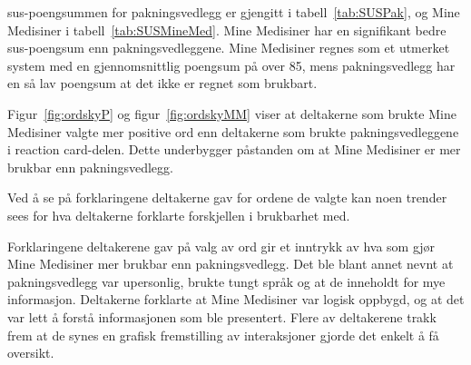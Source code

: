 \acrshort{sus}-poengsummen for pakningsvedlegg er gjengitt i tabell~\ref{tab:SUSPak}, og Mine Medisiner i tabell~\ref{tab:SUSMineMed}. Mine Medisiner har en signifikant bedre \acrshort{sus}-poengsum enn pakningsvedleggene. Mine Medisiner regnes som et utmerket system med en gjennomsnittlig poengsum på over 85, mens pakningsvedlegg har en så lav poengsum at det ikke er regnet som brukbart. 

Figur~\ref{fig:ordskyP} og figur~\ref{fig:ordskyMM} viser at deltakerne som brukte Mine Medisiner valgte mer positive ord enn deltakerne som brukte pakningsvedleggene i reaction card-delen. Dette underbygger påstanden om at Mine Medisiner er mer brukbar enn pakningsvedlegg. 

Ved å se på forklaringene deltakerne gav for ordene de valgte kan noen trender sees for hva deltakerne forklarte forskjellen i brukbarhet med.

Forklaringene deltakerene gav på valg av ord gir et inntrykk av hva som gjør Mine Medisiner mer brukbar enn pakningsvedlegg. Det ble blant annet nevnt at pakningsvedlegg var upersonlig, brukte tungt språk og at de inneholdt for mye informasjon. Deltakerne forklarte at Mine Medisiner var logisk oppbygd, og at det var lett å forstå informasjonen som ble presentert. Flere av deltakerene trakk frem at de synes en grafisk fremstilling av interaksjoner gjorde det enkelt å få oversikt. 